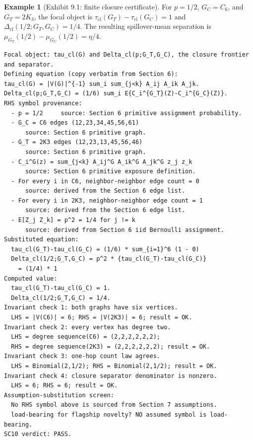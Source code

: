 \documentclass[11pt]{article}
\theoremstyle{definition}
\newtheorem{example}{Example}
\theoremstyle{plain}
\theoremstyle{remark}
\begin{document}
\begin{example}[Exhibit 9.1: finite closure certificate]\label{ex:closure-certificate}
For \(p=1/2\), \(G_C=C_6\), and \(G_T=2K_3\), the focal object is
\(\tau_{\mathrm{cl}}(G_T)-\tau_{\mathrm{cl}}(G_C)=1\) and
\(\Delta_{\mathrm{cl}}(1/2;G_T,G_C)=1/4\). The resulting spillover-mean separation is
\(\mu_{G_T}(1/2)-\mu_{G_C}(1/2)=\eta/4\).
\end{example}
\begin{verbatim}
Focal object: tau_cl(G) and Delta_cl(p;G_T,G_C), the closure frontier and separator.
Defining equation (copy verbatim from Section 6):
tau_cl(G) = |V(G)|^{-1} sum_i sum_{j<k} A_ij A_ik A_jk.
Delta_cl(p;G_T,G_C) = (1/6) sum_i E{C_i^{G_T}(Z)-C_i^{G_C}(Z)}.
RHS symbol provenance:
  - p = 1/2     source: Section 6 primitive assignment probability.
  - G_C = C6 edges (12,23,34,45,56,61)
      source: Section 6 primitive graph.
  - G_T = 2K3 edges (12,23,13,45,56,46)
      source: Section 6 primitive graph.
  - C_i^G(z) = sum_{j<k} A_ij^G A_ik^G A_jk^G z_j z_k
      source: Section 6 primitive exposure definition.
  - For every i in C6, neighbor-neighbor edge count = 0
      source: derived from the Section 6 edge list.
  - For every i in 2K3, neighbor-neighbor edge count = 1
      source: derived from the Section 6 edge list.
  - E[Z_j Z_k] = p^2 = 1/4 for j != k
      source: derived from Section 6 iid Bernoulli assignment.
Substituted equation:
  tau_cl(G_T)-tau_cl(G_C) = (1/6) * sum_{i=1}^6 (1 - 0)
  Delta_cl(1/2;G_T,G_C) = p^2 * {tau_cl(G_T)-tau_cl(G_C)}
    = (1/4) * 1
Computed value:
  tau_cl(G_T)-tau_cl(G_C) = 1.
  Delta_cl(1/2;G_T,G_C) = 1/4.
Invariant check 1: both graphs have six vertices.
  LHS = |V(C6)| = 6; RHS = |V(2K3)| = 6; result = OK.
Invariant check 2: every vertex has degree two.
  LHS = degree sequence(C6) = (2,2,2,2,2,2);
  RHS = degree sequence(2K3) = (2,2,2,2,2,2); result = OK.
Invariant check 3: one-hop count law agrees.
  LHS = Binomial(2,1/2); RHS = Binomial(2,1/2); result = OK.
Invariant check 4: closure separator denominator is nonzero.
  LHS = 6; RHS = 6; result = OK.
Assumption-substitution screen:
  No RHS symbol above is sourced from Section 7 assumptions.
  load-bearing for flagship novelty? NO assumed symbol is load-bearing.
SC10 verdict: PASS.
\end{verbatim}
\end{document}
